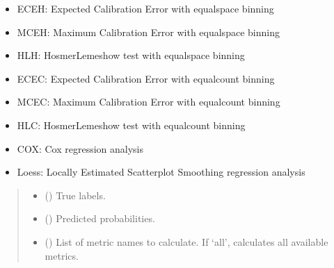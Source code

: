 \documentclass[letterpaper,10pt,english]{sphinxmanual}
\begin{document}
\begin{fulllineitems}
\begin{fulllineitems}
\begin{itemize}
\item {} 
\sphinxAtStartPar
ECE\sphinxhyphen{}H: Expected Calibration Error with equal\sphinxhyphen{}space binning

\item {} 
\sphinxAtStartPar
MCE\sphinxhyphen{}H: Maximum Calibration Error with equal\sphinxhyphen{}space binning

\item {} 
\sphinxAtStartPar
HL\sphinxhyphen{}H: Hosmer\sphinxhyphen{}Lemeshow test with equal\sphinxhyphen{}space binning

\item {} 
\sphinxAtStartPar
ECE\sphinxhyphen{}C: Expected Calibration Error with equal\sphinxhyphen{}count binning

\item {} 
\sphinxAtStartPar
MCE\sphinxhyphen{}C: Maximum Calibration Error with equal\sphinxhyphen{}count binning

\item {} 
\sphinxAtStartPar
HL\sphinxhyphen{}C: Hosmer\sphinxhyphen{}Lemeshow test with equal\sphinxhyphen{}count binning

\item {} 
\sphinxAtStartPar
COX: Cox regression analysis

\item {} 
\sphinxAtStartPar
Loess: Locally Estimated Scatterplot Smoothing regression analysis

\end{itemize}
\begin{quote}\begin{description}
\begin{itemize}
\item {} 
\sphinxAtStartPar
{} () \textendash{} True labels.

\item {} 
\sphinxAtStartPar
{} () \textendash{} Predicted probabilities.

\item {} 
\sphinxAtStartPar
{} () \textendash{} List of metric names to calculate. If ‘all’, calculates all available metrics.


\end{itemize}
\end{description}
\end{quote}
\end{fulllineitems}
\end{fulllineitems}
\end{document}
